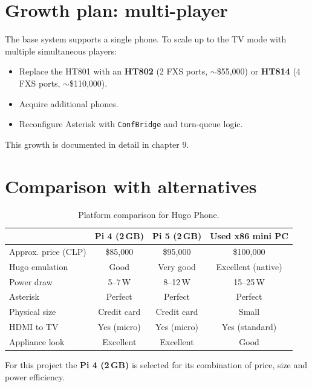 \section{Growth plan: multi-player}

The base system supports a single phone. To scale up to the TV mode with multiple simultaneous players:

\begin{itemize}
  \item Replace the HT801 with an \textbf{HT802} (2 FXS ports, $\sim$\$55,000) or \textbf{HT814} (4 FXS ports, $\sim$\$110,000).
  \item Acquire additional phones.
  \item Reconfigure Asterisk with \texttt{ConfBridge} and turn-queue logic.
\end{itemize}

This growth is documented in detail in chapter 9.

\section{Comparison with alternatives}

\begin{table}[h]
\centering
\begin{tabular}{lccc}
\toprule
& \textbf{Pi 4 (2\,GB)} & \textbf{Pi 5 (2\,GB)} & \textbf{Used x86 mini PC} \\
\midrule
Approx. price (CLP) & \$85,000 & \$95,000 & \$100,000 \\
Hugo emulation & Good & Very good & Excellent (native) \\
Power draw & 5--7\,W & 8--12\,W & 15--25\,W \\
Asterisk & Perfect & Perfect & Perfect \\
Physical size & Credit card & Credit card & Small \\
HDMI to TV & Yes (micro) & Yes (micro) & Yes (standard) \\
Appliance look & Excellent & Excellent & Good \\
\bottomrule
\end{tabular}
\caption{Platform comparison for Hugo Phone.}
\end{table}

For this project the \textbf{Pi 4 (2\,GB)} is selected for its combination of price, size and power efficiency.
